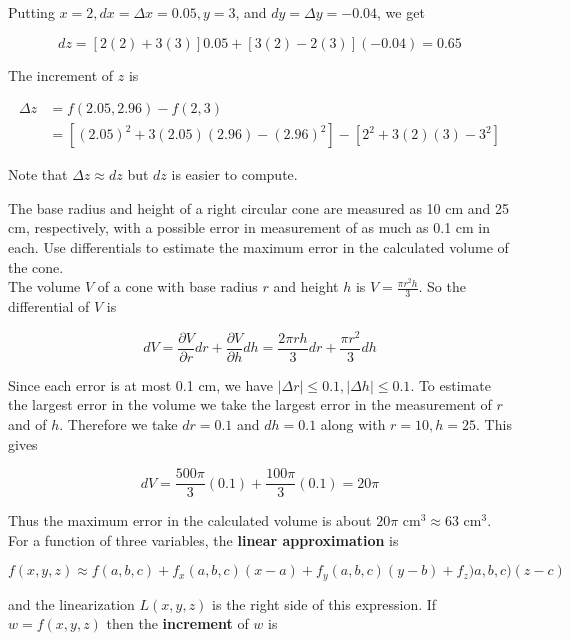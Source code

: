         Putting $x=2, dx = \Delta x = 0.05, y = 3$, and $dy = \Delta y = -0.04$, we get

        \[
            dz = [2(2) + 3(3)] 0.05 + [3(2) - 2(3)](-0.04) = 0.65
        \]

        The increment of $z$ is

        \begin{align*}
            \Delta z    &= f(2.05, 2.96) - f(2,3) \\
                        &= \left[(2.05)^2 + 3(2.05)(2.96) - (2.96)^2\right] - \left[2^2 + 3(2)(3) - 3^2 \right]
        \end{align*}

        Note that $\Delta z \approx dz$ but $dz$ is easier to compute.

        \textit{} The base radius and height of a right circular cone are measured as 10 cm and 25 cm, respectively, with a possible error in measurement of as much as 0.1 cm in each. Use differentials
        to estimate the maximum error in the calculated volume of the cone. \\

        The volume $V$ of a cone with base radius $r$ and height $h$ is $V = \frac{\pi r^2 h}{3}$. So the differential of $V$ is

        \[
            dV = \frac{\partial V}{\partial r}dr + \frac{\partial V}{\partial h} dh = \frac{2\pi rh}{3}dr + \frac{\pi r^2}{3}dh
        \]

        Since each error is at most 0.1 cm, we have $|\Delta r|\leq 0.1, |\Delta h| \leq 0.1$. To estimate the largest error in the volume we take the largest error in the measurement of $r$ and of $h$. Therefore we take
        $dr=0.1$ and $dh = 0.1$ along with $r=10,h=25$. This gives

        \[
            dV = \frac{500\pi}{3}(0.1) + \frac{100\pi}{3}(0.1) = 20\pi
        \]

        Thus the maximum error in the calculated volume is about $20\pi \text{ cm}^3\approx 63 \text{ cm}^3$. \\

        For a function of three variables, the \textbf{linear approximation} is

        \[
            f(x,y,z) \approx f(a,b,c) + f_x(a,b,c)(x-a) + f_y(a,b,c)(y-b) + f_z)a,b,c)(z-c)
        \]

        and the linearization $L(x,y,z)$ is the right side of this expression. If $w=f(x,y,z)$ then the \textbf{increment} of $w$ is


